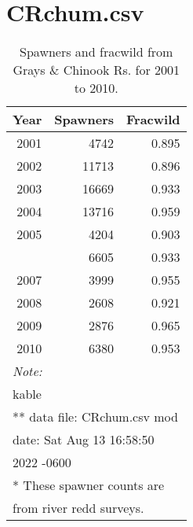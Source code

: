 \documentclass[
  letterpaper,
  oneside]{scrbook}
\newlength{\cslhangindent}
\newlength{\cslentryspacingunit} %
\newenvironment{CSLReferences}[2] %
 {%
  \setlength{\parindent}{0pt}
  \ifodd #1
  \let\oldpar\par
  \def\par{\hangindent=\cslhangindent\oldpar}
  \fi
  \setlength{\parskip}{#2\cslentryspacingunit}
 }%
 {}
\begin{document}

\hypertarget{refs}{}
\begin{CSLReferences}{0}{0}
\end{CSLReferences}

\appendix
{}

\hypertarget{crchum.csv}{%
\chapter{CRchum.csv}\label{crchum.csv}}

\hypertarget{tbl-appA1}{}
\begin{table}
\caption{\label{tbl-appA1}Spawners and fracwild from Grays \& Chinook Rs. for 2001 to 2010. }\tabularnewline

\centering
\begin{tabular}[t]{rrr}
\toprule
Year & Spawners & Fracwild\\
\midrule
2001 & 4742 & 0.895\\
2002 & 11713 & 0.896\\
2003 & 16669 & 0.933\\
2004 & 13716 & 0.959\\
2005 & 4204 & 0.903\\
\addlinespace
2006 & 6605 & 0.933\\
2007 & 3999 & 0.955\\
2008 & 2608 & 0.921\\
2009 & 2876 & 0.965\\
2010 & 6380 & 0.953\\
\bottomrule
\multicolumn{3}{l}{\rule{0pt}{1em}\textit{Note: }}\\
\multicolumn{3}{l}{\rule{0pt}{1em}kable}\\
\multicolumn{3}{l}{\textsuperscript{} ** data file: CRchum.csv mod}\\
\multicolumn{3}{l}{date: Sat Aug 13 16:58:50}\\
\multicolumn{3}{l}{2022 -0600}\\
\multicolumn{3}{l}{\textsuperscript{} * These spawner counts are}\\
\multicolumn{3}{l}{from river redd surveys.}\\
\end{tabular}
\end{table}

\newpage
\end{document}
